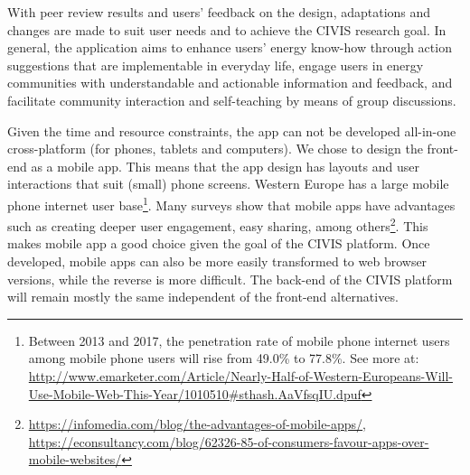 With peer review results and users' feedback on the design, adaptations and changes are made to suit user needs and to achieve the CIVIS research goal. 
In general, the application aims to enhance users' energy know-how through action suggestions that are implementable in everyday life, engage users in energy communities with understandable and actionable information and feedback, and facilitate community interaction and self-teaching by means of group discussions.
%

Given the time and resource constraints, the app can not be developed all-in-one cross-platform (for phones, tablets and computers). We chose to design the front-end as a mobile app. This means that the app design has layouts and user interactions that suit (small) phone screens. %
Western Europe has a large mobile phone internet user base\footnote{
Between 2013 and 2017, the penetration rate of mobile phone internet users among mobile phone users will rise from 49.0\% to 77.8\%. See more at: \url{ http://www.emarketer.com/Article/Nearly-Half-of-Western-Europeans-Will-Use-Mobile-Web-This-Year/1010510\#sthash.AaVfsqIU.dpuf}}. Many surveys show that mobile apps have advantages such as creating deeper user engagement, easy sharing, among others\footnote{\url{https://infomedia.com/blog/the-advantages-of-mobile-apps/}, \url{https://econsultancy.com/blog/62326-85-of-consumers-favour-apps-over-mobile-websites/}}. This makes mobile app a good choice given the goal of the CIVIS platform. Once developed, mobile apps can also be more easily transformed to web browser versions, while the reverse is more difficult. The back-end of the CIVIS platform will remain mostly the same independent of the front-end alternatives. 